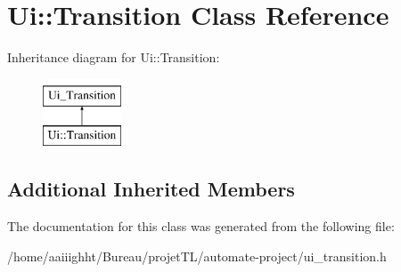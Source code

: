 \hypertarget{class_ui_1_1_transition}{\section{Ui\-:\-:Transition Class Reference}
\label{class_ui_1_1_transition}
}
Inheritance diagram for Ui\-:\-:Transition\-:\begin{figure}[H]
\begin{center}
\leavevmode
\includegraphics[height=2.000000cm]{class_ui_1_1_transition}
\end{center}
\end{figure}
\subsection*{Additional Inherited Members}


The documentation for this class was generated from the following file\-:\begin{DoxyCompactItemize}
\item 
/home/aaiiighht/\-Bureau/projet\-T\-L/automate-\/project/ui\-\_\-transition.\-h\end{DoxyCompactItemize}
